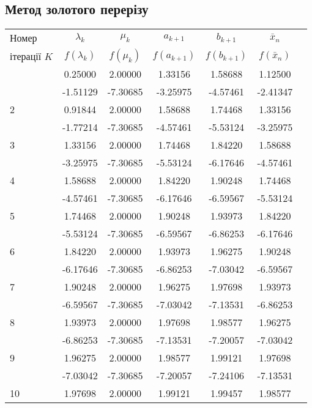 \documentclass[14pt,a4paper]{extarticle}
\theoremstyle{definition}
\begin{document}
\subsection{Метод золотого перерізу}

\begin{center}
\begin{longtable}{| l |*6{ c |}}\hline
Номер &$\lambda_k$&$\mu_k$&$a_{k+1}$&$b_{k+1}$&$\bar{x}_n$\\
ітерації $K$&$f(\lambda_k)$&$f(\mu_k)$&$f(a_{k+1})$&$f(b_{k+1})$&$f(\bar{x}_n)$\\\hline
\endfirsthead
\endlastfoot
  1 &  0.25000 &  2.00000 &  1.33156 &  1.58688 &  1.12500 \\*
    & -1.51129 & -7.30685 & -3.25975 & -4.57461 & -2.41347 \\\hline
  2 &  0.91844 &  2.00000 &  1.58688 &  1.74468 &  1.33156 \\*
    & -1.77214 & -7.30685 & -4.57461 & -5.53124 & -3.25975 \\\hline
  3 &  1.33156 &  2.00000 &  1.74468 &  1.84220 &  1.58688 \\*
    & -3.25975 & -7.30685 & -5.53124 & -6.17646 & -4.57461 \\\hline
  4 &  1.58688 &  2.00000 &  1.84220 &  1.90248 &  1.74468 \\*
    & -4.57461 & -7.30685 & -6.17646 & -6.59567 & -5.53124 \\\hline
  5 &  1.74468 &  2.00000 &  1.90248 &  1.93973 &  1.84220 \\*
    & -5.53124 & -7.30685 & -6.59567 & -6.86253 & -6.17646 \\\hline
  6 &  1.84220 &  2.00000 &  1.93973 &  1.96275 &  1.90248 \\*
    & -6.17646 & -7.30685 & -6.86253 & -7.03042 & -6.59567 \\\hline
  7 &  1.90248 &  2.00000 &  1.96275 &  1.97698 &  1.93973 \\*
    & -6.59567 & -7.30685 & -7.03042 & -7.13531 & -6.86253 \\\hline
  8 &  1.93973 &  2.00000 &  1.97698 &  1.98577 &  1.96275 \\*
    & -6.86253 & -7.30685 & -7.13531 & -7.20057 & -7.03042 \\\hline
  9 &  1.96275 &  2.00000 &  1.98577 &  1.99121 &  1.97698 \\*
    & -7.03042 & -7.30685 & -7.20057 & -7.24106 & -7.13531 \\\hline
 10 &  1.97698 &  2.00000 &  1.99121 &  1.99457 &  1.98577 \\*

\end{longtable}
\end{center}
\end{document}
